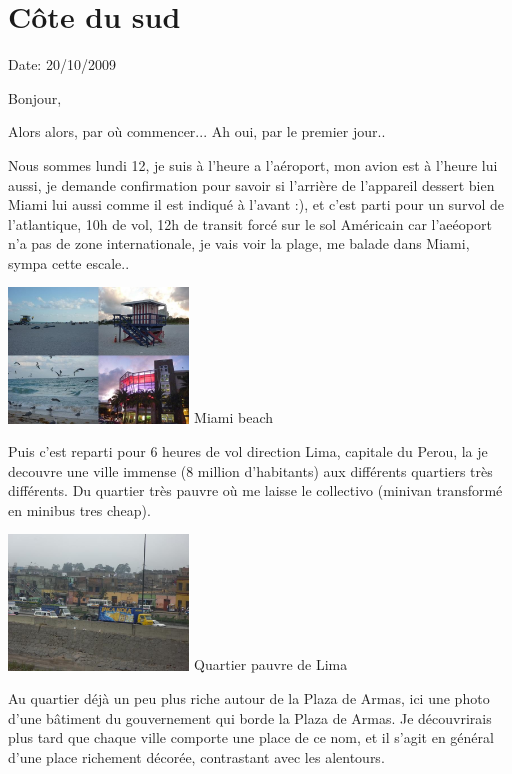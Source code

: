 \section{Côte du sud}

Date: 20/10/2009

\begin{multicols}{2}

Bonjour,

Alors alors, par où commencer... Ah oui, par le premier jour..

Nous sommes lundi 12, je suis à l'heure a l'aéroport, mon avion est à l'heure lui aussi, je demande confirmation pour savoir si l'arrière de l'appareil dessert bien Miami lui aussi comme il est indiqué à l'avant :), et c'est parti pour un survol de l'atlantique, 10h de vol, 12h de transit forcé sur le sol Américain car l'aeéoport n'a pas de zone internationale, je vais voir la plage, me balade dans Miami, sympa cette escale..

\hspace*{-0.65cm}
\includegraphics[width=4.8cm]{articles/Cote-du-sud/1255996649K0tQ.jpg}
Miami beach


Puis c'est reparti pour 6 heures de vol direction Lima, capitale du Perou, la je decouvre une ville immense (8 million d'habitants) aux différents quartiers très différents. Du quartier très pauvre où me laisse le collectivo (minivan transformé en minibus tres cheap).

\hspace*{-0.65cm}
\includegraphics[width=4.8cm]{articles/Cote-du-sud/1255996655Vfsf.jpg}
Quartier pauvre de Lima


Au quartier déjà un peu plus riche autour de la Plaza de Armas, ici une photo d'une bâtiment du gouvernement qui borde la Plaza de Armas. Je découvrirais plus tard que chaque ville comporte une place de ce nom, et il s'agit en général d'une place richement décorée, contrastant avec les alentours.


\end{multicols}
